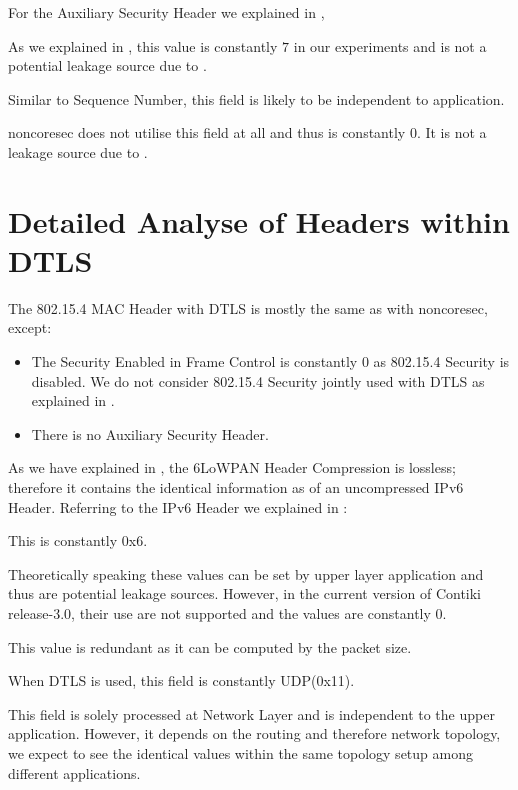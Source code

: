 For the Auxiliary Security Header we explained in ,

\begin{description}[style=nextline]
	\item[Security Level]
	As we explained in , this value is constantly $7$ in our experiments and is not a potential leakage source due to .
	\item[Frame Counter]
	Similar to Sequence Number, this field is likely to be independent to application.
	\item[Key Strategy]
	noncoresec does not utilise this field at all and thus is constantly $0$. It is not a leakage source due to .
\end{description}

\section{Detailed Analyse of Headers within DTLS} \label{Detail DTLS Header}

The 802.15.4  MAC Header with DTLS is mostly the same as with noncoresec, except:

\begin{itemize}
	\item The Security Enabled in Frame Control is constantly $0$ as 802.15.4 Security is disabled. We do not consider 802.15.4 Security jointly used with DTLS as explained in .
	\item There is no Auxiliary Security Header.
\end{itemize}

As we have explained in , the 6LoWPAN Header Compression is lossless; therefore it contains the identical information as of an uncompressed IPv6 Header. Referring to the IPv6 Header we explained in :

\begin{description}[style=nextline]
	\item[Version]
	This is constantly 0x6.
	\item[Traffic Class and Flow Label]
	Theoretically speaking these values can be set by upper layer application and thus are potential leakage sources. However, in the current version of Contiki release-3.0, their use are not supported and the values are constantly $0$.
	\item[Payload Length]
	This value is redundant as it can be computed by the packet size.
	\item[Next Header]
	When DTLS is used, this field is constantly UDP(0x11).
	\item[Hop Limit]
	This field is solely processed at Network Layer and is independent to the upper application. However, it depends on the routing and therefore network topology, we expect to see the identical values within the same topology setup among different applications.
\end{description}


